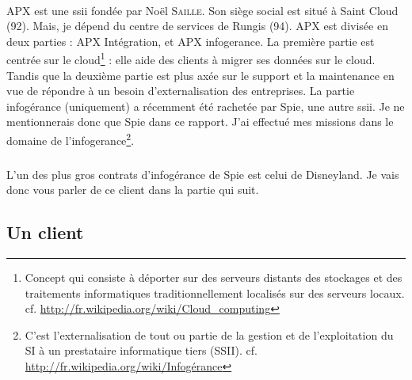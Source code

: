 \paragraph{}
APX est une \gls{ssii} fondée par Noël \textsc{Saille}. Son siège social est situé à Saint Cloud (92). Mais, je dépend du centre de services de Rungis (94).
APX est divisée en deux parties : APX Intégration, et APX \Gls{infogerance}.
La première partie est centrée sur le \foreignlanguage{english}{\gls{cloud}}\footnote{Concept qui consiste à déporter sur des serveurs distants des stockages et des traitements informatiques traditionnellement localisés sur des serveurs locaux. cf. \url{http://fr.wikipedia.org/wiki/Cloud_computing}} : elle aide des clients à migrer ses données sur le \foreignlanguage{english}{cloud}.
Tandis que la deuxième partie est plus axée sur le support et la maintenance en vue de répondre à un besoin d'externalisation des entreprises. La partie infogérance (uniquement) a récemment été rachetée par Spie, une autre \gls{ssii}. Je ne mentionnerais donc que Spie dans ce rapport.
J'ai effectué mes missions dans le domaine de l'\gls{infogerance}\footnote{C’est l’externalisation de tout ou partie de la gestion et de l’exploitation du SI à un prestataire informatique tiers (SSII). cf. \url{http://fr.wikipedia.org/wiki/Infogérance}}.
\subparagraph{}
L'un des plus gros contrats d'infogérance de Spie est celui de Disneyland. Je vais donc vous parler de ce client dans la partie qui suit.


\subsection{Un client}
